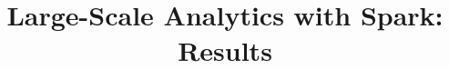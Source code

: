 \documentclass[sigconf]{acmart}
\begin{document}
\title{Large-Scale Analytics with Spark: Results}
\maketitle

\end{document}
